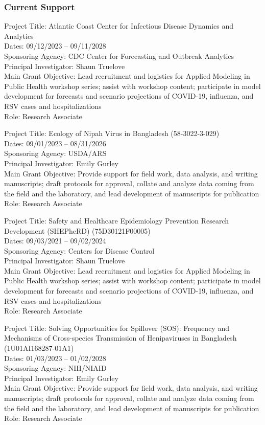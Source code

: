 \documentclass{cv}
\begin{document}
\subsubsection*{Current Support}

Project Title: Atlantic Coast Center for Infectious Disease Dynamics and Analytics \\
Dates: 09/12/2023 -- 09/11/2028 \\
Sponsoring Agency: CDC Center for Forecasting and Outbreak Analytics \\
Principal Investigator: Shaun Truelove \\
Main Grant Objective: Lead recruitment and logistics for Applied Modeling in Public Health workshop series; assist with workshop content; participate in model development for forecasts and scenario projections of COVID-19, influenza, and RSV cases and hospitalizations \\
Role: Research Associate

Project Title: Ecology of Nipah Virus in Bangladesh (58-3022-3-029) \\
Dates: 09/01/2023 -- 08/31/2026 \\
Sponsoring Agency: USDA/ARS \\
Principal Investigator: Emily Gurley \\
Main Grant Objective: Provide support for field work, data analysis, and writing manuscripts; draft protocols for approval, collate and analyze data coming from the field and the laboratory, and lead development of manuscripts for publication \\
Role: Research Associate

Project Title: Safety and Healthcare Epidemiology Prevention Research Development (SHEPheRD) (75D30121F00005) \\
Dates: 09/03/2021 -- 09/02/2024 \\
Sponsoring Agency: Centers for Disease Control \\
Principal Investigator: Shaun Truelove \\
Main Grant Objective: Lead recruitment and logistics for Applied Modeling in Public Health workshop series; assist with workshop content; participate in model development for forecasts and scenario projections of COVID-19, influenza, and RSV cases and hospitalizations \\
Role: Research Associate

Project Title: Solving Opportunities for Spillover (SOS): Frequency and Mechanisms of Cross-species Transmission of Henipaviruses in Bangladesh (1U01AI168287-01A1) \\
Dates: 01/03/2023 -- 01/02/2028 \\
Sponsoring Agency: NIH/NIAID \\
Principal Investigator: Emily Gurley \\
Main Grant Objective: Provide support for field work, data analysis, and writing manuscripts; draft protocols for approval, collate and analyze data coming from the field and the laboratory, and lead development of manuscripts for publication \\
Role: Research Associate
\end{document}
